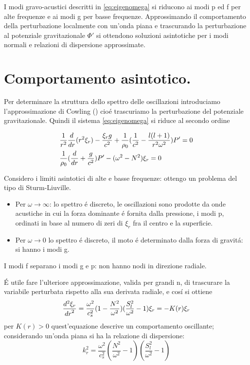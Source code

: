 \documentclass[../main.tex]{subfiles}
\begin{document}
I modi gravo-acustici descritti in \eqref{eq:eigenomega} si riducono ai modi p ed f per alte frequenze e ai modi g per basse frequenze. Approssimando il comportamento della perturbazione localmente con un'onda piana e trascurando la perturbazione al potenziale gravitazionale $\Phi'$ si ottendono soluzioni asintotiche per i modi normali e relazioni di dispersione approssimate.

\section{Comportamento asintotico.}

Per determinare la struttura dello spettro delle oscillazioni introduciamo l'approssimazione di Cowling (\cite{cow41oscillations}) cio\'e trascuriamo la perturbazione del potenziale gravitazionale. Quindi il sistema \eqref{eq:eigenomega} si riduce al secondo ordine

\begin{subequations}\label{cowosc:main}
\begin{align}
&\frac{1}{r^2}\TDof{r}(r^2\xi_r)-\frac{\xi_rg}{c^2}+\frac{1}{\rho_0}(\frac{1}{c^2}-\frac{l(l+1)}{r^2\omega^2})P'=0\label{cowosc:a}\\
&\frac{1}{\rho_0}(\TDof{r}+\frac{g}{c^2})P'-(\omega^2-N^2)\xi_r=0\label{cowosc:b}
\end{align}
\end{subequations}


Considero i limiti asintotici di alte e basse frequenze: ottengo un problema del tipo di Sturm-Liuville.
\begin{itemize}
\item Per $\omega\to\infty$: lo spettro \'e discreto, le oscillazioni sono prodotte da onde acustiche in cui la forza dominante \'e fornita dalla pressione, i modi p, ordinati in base al numero di zeri di $\xi_r$ fra il centro e la superficie.

\item Per $\omega\to0$ lo spettro \'e discreto, il moto \'e determinato dalla forza di gravit\'a: si hanno i modi g.

\end{itemize}
I modi f separano i modi g e p: non hanno nodi in direzione radiale.

\'E utile fare l'ulteriore approssimazione, valida per grandi n, di trascurare la variabile perturbata rispetto alla sua derivata radiale, e cos\'i si ottiene
\begin{equation}\label{eq:secondorder}
\TtwoDy{r}{\xi_r}=\frac{\omega^2}{c_s^2}(1-\frac{N^2}{\omega^2})(\frac{S_l^2}{\omega^2}-1)\xi_r=-K(r)\xi_r
\end{equation}
per $K(r)>0$ quest'equazione descrive un comportamento oscillante; considerando un'onda piana si ha la relazione di dispersione:
\begin{equation}
k_r^2=\frac{\omega^2}{c_s^2}(\frac{N^2}{\omega^2}-1)(\frac{S_l^2}{\omega^2}-1)\label{eq:approximatedispersion}
\end{equation}
\end{document}
